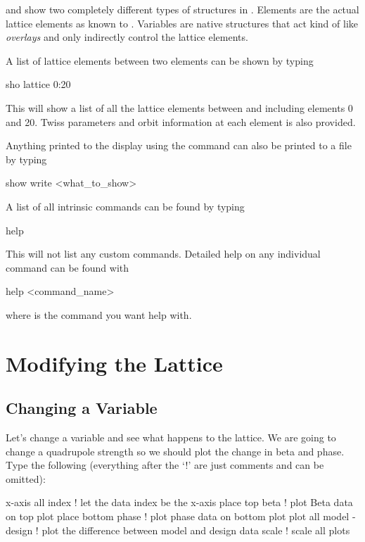 and  show two completely different types of
structures in \tao. Elements are the actual lattice elements as known
to \bmad.  Variables are native \tao structures that act kind of like
\bmad \textit{overlays} and only indirectly control the lattice
elements.

A list of lattice elements between two elements can be shown by typing 
\begin{example}
  sho lattice 0:20
\end{example}
This will show a list of all the lattice elements between and
including elements 0 and 20. Twiss parameters and orbit information at
each element is also provided.

Anything printed to the display using the  command can also
be printed to a file by typing
\begin{example}
  show write <what_to_show>
\end{example}

A list of all intrinsic  commands can be found by typing
\begin{example}
  help
\end{example}
This will not list any custom commands. Detailed help on any
individual command can be found with
\begin{example}
  help <command\_name>
\end{example}
where  is the command you want help with.

\section{Modifying the Lattice}
\label{s:modify_lattice}

\subsection{Changing a Variable}
\label{ss:change_variable}

Let's change a variable and see what happens to the lattice. We are going to
change a quadrupole strength so we should plot the change in beta and phase.
Type the following (everything after the `!' are just comments and can be
omitted):
\begin{example}
  x-axis all index        ! let the data index be the x-axis
  place top beta          ! plot Beta data on top plot
  place bottom phase      ! plot phase data on bottom plot
  plot all model - design ! plot the difference between model and design data
  scale                   ! scale all plots
\end{example}

